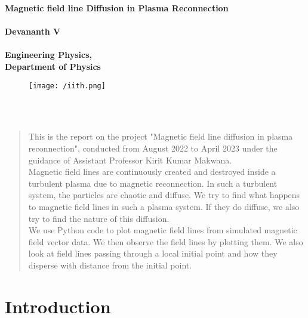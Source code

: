 \documentclass[fleqn]{report}
\begin{document}
	\begin{titlepage}
		\begin{center}
			\vspace*{1cm}
			\textbf{\Huge Magnetic field line Diffusion in Plasma Reconnection}{\Huge}\\
			\\
			\vspace{1.5cm}
			\textbf{\Large Devananth V}\\
			\\
			\vspace{1cm}
			\textbf{\LARGE Engineering Physics,\\ Department of Physics}\\
			\vspace{1cm}
			
			\begin{figure}[!h]
				\centering
				\texttt{[image: /iith.png]}	
			\end{figure}	
			\vspace{1cm}
			\\
			\\
		\end{center}
	\end{titlepage}
	\tableofcontents
	\begin{abstract}
	This is the report on the project "Magnetic field line diffusion in plasma reconnection", conducted from August 2022 to April 2023 under the guidance of Assistant Professor Kirit Kumar Makwana.\\
	Magnetic field lines are continuously created and destroyed inside a turbulent plasma due to magnetic reconnection. In such a turbulent system, the particles are chaotic and diffuse. We try to find what happens to magnetic field lines in such a plasma system. If they do diffuse, we also try to find the nature of this diffusion.\\
	We use Python code to plot magnetic field lines from simulated magnetic field vector data. We then observe the field lines by plotting them. We also look at field lines passing through a local initial point and how they disperse with distance from the initial point. 
		
	\end{abstract}
	\chapter{Introduction}
\end{document}
